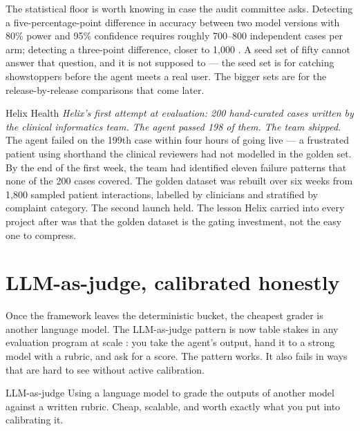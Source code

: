 The statistical floor is worth knowing in case the audit committee asks. Detecting a five-percentage-point difference in accuracy between two model versions with 80\% power and 95\% confidence requires roughly 700--800 independent cases per arm; detecting a three-point difference, closer to 1{,}000 \citep{millerErrorBars2024}. A seed set of fifty cannot answer that question, and it is not supposed to --- the seed set is for catching showstoppers before the agent meets a real user. The bigger sets are for the release-by-release comparisons that come later.

\begin{TNinpractice}{Helix Health}
\textit{Helix's first attempt at evaluation: 200 hand-curated cases written by the clinical informatics team. The agent passed 198 of them. The team shipped.} The agent failed on the 199th case within four hours of going live --- a frustrated patient using shorthand the clinical reviewers had not modelled in the golden set. By the end of the first week, the team had identified eleven failure patterns that none of the 200 cases covered. The golden dataset was rebuilt over six weeks from 1,800 sampled patient interactions, labelled by clinicians and stratified by complaint category. The second launch held. The lesson Helix carried into every project after was that the golden dataset is the gating investment, not the easy one to compress.
\end{TNinpractice}

\section{LLM-as-judge, calibrated honestly}

Once the framework leaves the deterministic bucket, the cheapest grader is another language model. The LLM-as-judge pattern is now table stakes in any evaluation program at scale \citep{zheng2023mtbench, liu2023trustworthy-survey}: you take the agent's output, hand it to a strong model with a rubric, and ask for a score. The pattern works. It also fails in ways that are hard to see without active calibration.

\begin{TNdefinition}{LLM-as-judge}
Using a language model to grade the outputs of another model against a written rubric. Cheap, scalable, and worth exactly what you put into calibrating it.
\end{TNdefinition}

